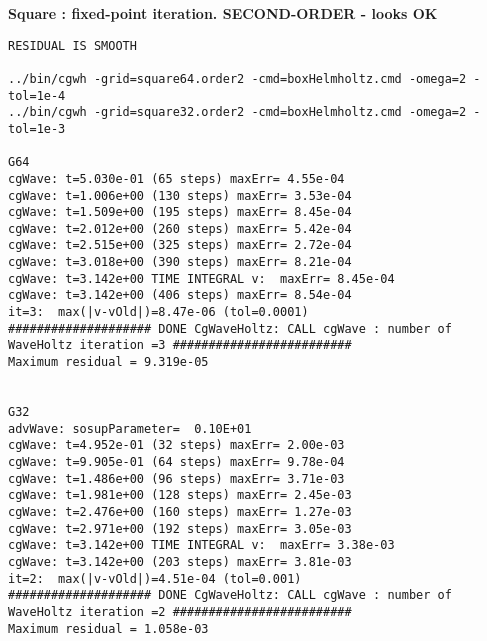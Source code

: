 \bigskip
\textbf{Square : fixed-point iteration. SECOND-ORDER - looks OK}
\begin{Verbatim}[fontsize=\scriptsize]
RESIDUAL IS SMOOTH

../bin/cgwh -grid=square64.order2 -cmd=boxHelmholtz.cmd -omega=2 -tol=1e-4
../bin/cgwh -grid=square32.order2 -cmd=boxHelmholtz.cmd -omega=2 -tol=1e-3

G64
cgWave: t=5.030e-01 (65 steps) maxErr= 4.55e-04
cgWave: t=1.006e+00 (130 steps) maxErr= 3.53e-04
cgWave: t=1.509e+00 (195 steps) maxErr= 8.45e-04
cgWave: t=2.012e+00 (260 steps) maxErr= 5.42e-04
cgWave: t=2.515e+00 (325 steps) maxErr= 2.72e-04
cgWave: t=3.018e+00 (390 steps) maxErr= 8.21e-04
cgWave: t=3.142e+00 TIME INTEGRAL v:  maxErr= 8.45e-04
cgWave: t=3.142e+00 (406 steps) maxErr= 8.54e-04
it=3:  max(|v-vOld|)=8.47e-06 (tol=0.0001)
#################### DONE CgWaveHoltz: CALL cgWave : number of WaveHoltz iteration =3 #########################
Maximum residual = 9.319e-05


G32
advWave: sosupParameter=  0.10E+01
cgWave: t=4.952e-01 (32 steps) maxErr= 2.00e-03
cgWave: t=9.905e-01 (64 steps) maxErr= 9.78e-04
cgWave: t=1.486e+00 (96 steps) maxErr= 3.71e-03
cgWave: t=1.981e+00 (128 steps) maxErr= 2.45e-03
cgWave: t=2.476e+00 (160 steps) maxErr= 1.27e-03
cgWave: t=2.971e+00 (192 steps) maxErr= 3.05e-03
cgWave: t=3.142e+00 TIME INTEGRAL v:  maxErr= 3.38e-03
cgWave: t=3.142e+00 (203 steps) maxErr= 3.81e-03
it=2:  max(|v-vOld|)=4.51e-04 (tol=0.001)
#################### DONE CgWaveHoltz: CALL cgWave : number of WaveHoltz iteration =2 #########################
Maximum residual = 1.058e-03
\end{Verbatim}


